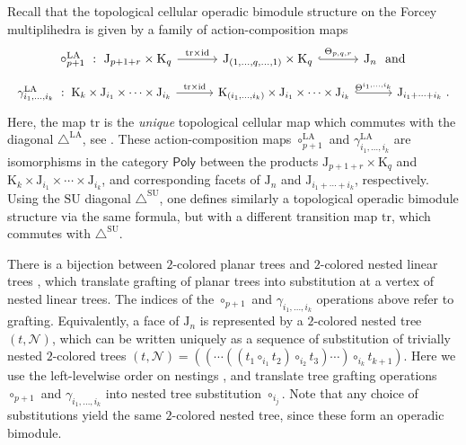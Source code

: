 \documentclass{amsart}
\theoremstyle{definition}
\newcommand{\K}{\mathrm{K}} %
\newcommand{\J}{\mathrm{J}} %
\newcommand{\SU}{\mathrm{SU}}
\newcommand{\LA}{\mathrm{LA}}
\newcommand{\SUD}{\triangle^{\mathrm{SU}}}
\newcommand{\LAD}{\triangle^{\mathrm{LA}}}
\newcommand{\PolySub}{\mathsf{Poly}}
\newcommand{\tr}{\mathrm{tr}}
\newcommand{\id}{\mathrm{id}}
\begin{document}
Recall that the topological cellular operadic bimodule structure on the Forcey multiplihedra is given by a family of action-composition maps \cite[Def. 2.13]{LaplanteAnfossiMazuir}
\[
\vcenter{\hbox{
\begin{tikzcd}[column sep = 16pt]
\circ_{p+1}^\LA\ : \ \J_{p+1+r}\times \K_q
\arrow[rr,  "\tr\times \id"]
& & 
\J_{(1,\ldots,q,\ldots,1)}\times \K_q 
\arrow[rr,hookrightarrow, "\Theta_{p,q,r}"]
&  &
\J_{n}\ \ \text{and}
\end{tikzcd}
}}
\]
\[
\vcenter{\hbox{
\begin{tikzcd}[column sep = 16pt]
\gamma_{i_1,\ldots,i_k}^\LA \ : \ \K_{k}\times \J_{i_1} \times \cdots \times \J_{i_k}
\arrow[rr,  "\tr\times \id"]
& &
\K_{(i_1,\ldots,i_k)} \times \J_{i_1} \times \cdots \times \J_{i_k} 
\arrow[rr,hookrightarrow, "\Theta^{i_1, \ldots , i_k}"]
& &
\J_{i_1+\cdots + i_k}\ .
\end{tikzcd}
}}
\]
Here, the map $\tr$ is the \emph{unique} topological cellular map which commutes with the diagonal $\LAD$, see \cite[Prop. 7]{MasudaThomasTonksVallette}. 
These action-composition maps $\circ_{p+1}^\LA$ and $\gamma_{i_1,\ldots,i_k}^\LA$ are isomorphisms in the category $\PolySub$ \cite[Sec.~2.1]{LaplanteAnfossiMazuir} between the products $\J_{p+1+r}\times \K_q$ and $\K_{k}\times \J_{i_1} \times \cdots \times \J_{i_k}$, and corresponding facets of $\J_n$ and $\J_{i_1 + \cdots + i_k}$, respectively.
Using the $\SU$ diagonal $\SUD$, one defines similarly a topological operadic bimodule structure via the same formula, but with a different transition map $\tr$, which commutes with $\SUD$.

There is a bijection between $2$-colored planar trees and $2$-colored nested linear trees \cite[Lem.~3.4 \& Fig.~6]{LaplanteAnfossiMazuir}, which translate grafting of planar trees into substitution at a vertex of nested linear trees.
The indices of the $\circ_{p+1}$ and $\gamma_{i_1,\ldots,i_k}$ operations above refer to grafting. 
Equivalently, a face of $\J_n$ is represented by a $2$-colored nested tree $(t,\mathcal{N})$, which can be written uniquely as a sequence of substitution of trivially nested $2$-colored trees $(t,\mathcal{N})=((\cdots((t_1\circ_{i_1} t_2) \circ_{i_2} t_3) \cdots )\circ_{i_k} t_{k+1})$.
Here we use the left-levelwise order on nestings \cite[Def. 4.12]{LaplanteAnfossiMazuir}, and translate tree grafting operations $\circ_{p+1}$ and $\gamma_{i_1,\ldots,i_k}$ into nested tree substitution $\circ_{i_j}$.
Note that any choice of substitutions yield the same $2$-colored nested tree, since these form an operadic bimodule.
\end{document}
